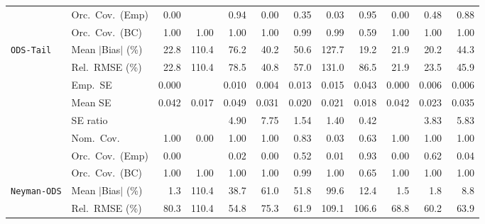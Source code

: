 \begin{landscape}
\begin{longtable}{llrrrrrrrrrr}
 & Orc.\ Cov.\ (Emp) & 0.00 &  & \cellcolor{ranktwo}0.94 & 0.00 & 0.35 & 0.03 & \cellcolor{rankone}0.95 & 0.00 & 0.48 & \cellcolor{rankthree}0.88 \\
 & Orc.\ Cov.\ (BC) & \cellcolor{ranktwo}1.00 & \cellcolor{ranktwo}1.00 & \cellcolor{ranktwo}1.00 & \cellcolor{ranktwo}1.00 & \cellcolor{rankone}0.99 & \cellcolor{rankone}0.99 & \cellcolor{rankthree}0.59 & \cellcolor{ranktwo}1.00 & \cellcolor{ranktwo}1.00 & \cellcolor{ranktwo}1.00 \\
\addlinespace[2pt]
\quad \texttt{ODS-Tail} & Mean $|$Bias$|$ (\%) & 22.8 & 110.4 & 76.2 & 40.2 & 50.6 & 127.7 & \cellcolor{rankone}19.2 & \cellcolor{rankthree}21.9 & \cellcolor{ranktwo}20.2 & 44.3 \\
 & Rel.\ RMSE (\%) & \cellcolor{ranktwo}22.8 & 110.4 & 78.5 & 40.8 & 57.0 & 131.0 & 86.5 & \cellcolor{rankone}21.9 & \cellcolor{rankthree}23.5 & 45.9 \\
 & Emp.\ SE & 0.000 &  & 0.010 & 0.004 & 0.013 & 0.015 & 0.043 & 0.000 & 0.006 & 0.006 \\
 & Mean SE & 0.042 & 0.017 & 0.049 & 0.031 & 0.020 & 0.021 & 0.018 & 0.042 & 0.023 & 0.035 \\
 & SE ratio &  &  & 4.90 & 7.75 & \cellcolor{ranktwo}1.54 & \cellcolor{rankone}1.40 & \cellcolor{rankthree}0.42 &  & 3.83 & 5.83 \\
 & Nom.\ Cov. & \cellcolor{rankone}1.00 & 0.00 & \cellcolor{rankone}1.00 & \cellcolor{rankone}1.00 & \cellcolor{ranktwo}0.83 & 0.03 & \cellcolor{rankthree}0.63 & \cellcolor{rankone}1.00 & \cellcolor{rankone}1.00 & \cellcolor{rankone}1.00 \\
 & Orc.\ Cov.\ (Emp) & 0.00 &  & 0.02 & 0.00 & \cellcolor{rankthree}0.52 & 0.01 & \cellcolor{rankone}0.93 & 0.00 & \cellcolor{ranktwo}0.62 & 0.04 \\
 & Orc.\ Cov.\ (BC) & \cellcolor{ranktwo}1.00 & \cellcolor{ranktwo}1.00 & \cellcolor{ranktwo}1.00 & \cellcolor{ranktwo}1.00 & \cellcolor{rankone}0.99 & \cellcolor{ranktwo}1.00 & \cellcolor{rankthree}0.65 & \cellcolor{ranktwo}1.00 & \cellcolor{ranktwo}1.00 & \cellcolor{ranktwo}1.00 \\
\addlinespace[2pt]
\quad \texttt{Neyman-ODS} & Mean $|$Bias$|$ (\%) & \cellcolor{rankone}1.3 & 110.4 & 38.7 & 61.0 & 51.8 & 99.6 & 12.4 & \cellcolor{ranktwo}1.5 & \cellcolor{rankthree}1.8 & 8.8 \\
 & Rel.\ RMSE (\%) & 80.3 & 110.4 & \cellcolor{rankone}54.8 & 75.3 & \cellcolor{rankthree}61.9 & 109.1 & 106.6 & 68.8 & \cellcolor{ranktwo}60.2 & 63.9 \\

\end{longtable}
\end{landscape}
